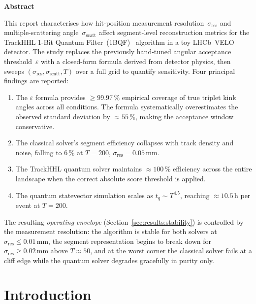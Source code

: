 \documentclass[11pt,a4paper]{article}
\newcommand{\eps}{\varepsilon}
\newcommand{\sres}{\sigma_{\mathrm{res}}}
\newcommand{\sscat}{\sigma_{\mathrm{scatt}}}
\newcommand{\ntrk}{T}
\newenvironment{abstractbox}{%
  \setlength{\fboxsep}{8pt}%
  \begin{lrbox}{\abstractsavebox}%
  \begin{minipage}{0.86\linewidth}%
  \textbf{Abstract}\par\smallskip
}{%
  \end{minipage}%
  \end{lrbox}%
  \begin{center}\colorbox{gray!10}{\usebox{\abstractsavebox}}\end{center}%
}
\begin{document}
\begin{abstractbox}
This report characterises how hit-position measurement resolution~$\sres$ and
multiple-scattering angle~$\sscat$ affect segment-level reconstruction metrics for the
TrackHHL 1-Bit Quantum Filter~(1BQF)~\cite{onebqf} algorithm in a toy LHCb~VELO detector.
The study replaces the previously hand-tuned angular acceptance threshold~$\eps$ with a
closed-form formula derived from detector physics, then sweeps
$(\sres,\sscat,\ntrk)$ over a full grid to quantify sensitivity.
Four principal findings are reported:
\begin{enumerate}[noitemsep,topsep=2pt]
  \item The $\eps$ formula provides $\geq\!99.97\,\%$ empirical coverage of true triplet
        kink angles across all conditions.  The formula systematically overestimates the
        observed standard deviation by $\approx\!55\,\%$, making the acceptance window
        conservative.
  \item The classical solver's segment efficiency collapses with track density and noise,
        falling to $6\,\%$ at $\ntrk=200$, $\sres=0.05\,\mathrm{mm}$.
  \item The TrackHHL quantum solver maintains ${\approx}100\,\%$ efficiency across the
        entire landscape when the correct absolute score threshold is applied.
  \item The quantum statevector simulation scales as $t_q\!\sim\!\ntrk^{4.5}$,
        reaching $\approx\!10.5\,\mathrm{h}$ per event at $\ntrk=200$.
\end{enumerate}
The resulting \emph{operating envelope} (Section~\ref{sec:results:stability}) is
controlled by the measurement resolution: the algorithm is stable for both solvers at
$\sres\leq0.01\,\mathrm{mm}$, the segment representation begins to break down for
$\sres\geq0.02\,\mathrm{mm}$ above $\ntrk\approx50$, and at the worst corner the
classical solver fails at a cliff edge while the quantum solver degrades gracefully in
purity only.
\end{abstractbox}

\tableofcontents
\newpage

\section{Introduction}
\label{sec:intro}
\end{document}
